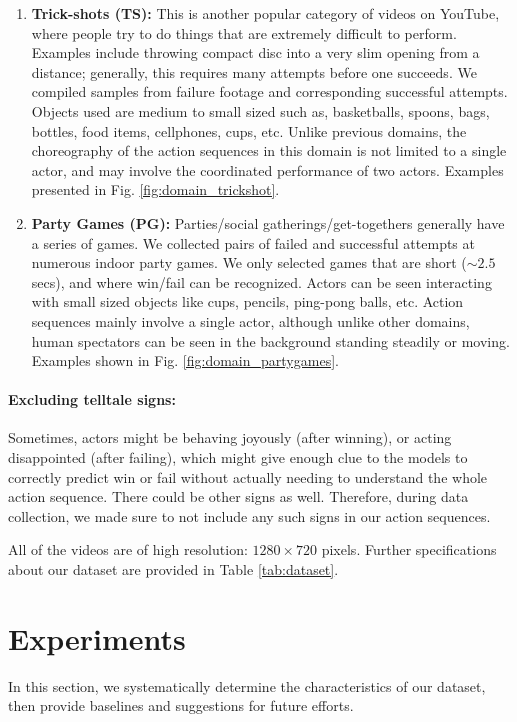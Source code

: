 \documentclass[final]{cvpr}
\begin{document}
\begin{enumerate}
\item{\textbf{Trick-shots (TS):}}
This is another popular category of videos on YouTube, where people try to do things that are extremely difficult to perform. Examples include throwing compact disc into a very slim opening from a distance; generally, this requires many attempts before one succeeds. We compiled samples from failure footage and corresponding successful attempts. Objects used are medium to small sized such as, basketballs, spoons, bags, bottles, food items, cellphones, cups, etc. Unlike previous domains, the choreography of the action sequences in this domain is not limited to a single actor, and may involve the coordinated performance of two actors. Examples presented in Fig. \ref{fig:domain_trickshot}.

\item{\textbf{Party Games (PG):}}
Parties/social gatherings/get-togethers generally have a series of games. 
We collected pairs of failed and successful attempts at numerous indoor party games. We only selected games that are short ($\sim2.5$ secs), and where win/fail can be recognized. Actors can be seen interacting with small sized objects like cups, pencils, ping-pong balls, etc. Action sequences mainly involve a single actor, although unlike other domains, human spectators can be seen in the background standing steadily or moving. Examples shown in Fig. \ref{fig:domain_partygames}.
\end{enumerate}

\paragraph{Excluding telltale signs:} Sometimes, actors might be behaving joyously (after winning), or acting disappointed (after failing), which might give enough clue to the models to correctly predict win or fail without actually needing to understand the whole action sequence. There could be other signs as well. Therefore, during data collection, we made sure to not include any such signs in our action sequences.

All of the videos are of high resolution: $1280 \times 720$ pixels. Further specifications about our dataset are provided in Table \ref{tab:dataset}. \section{Experiments}
\label{sec:exp}
In this section, we systematically determine the characteristics of our dataset, then provide baselines and suggestions for future efforts. 
\end{document}

